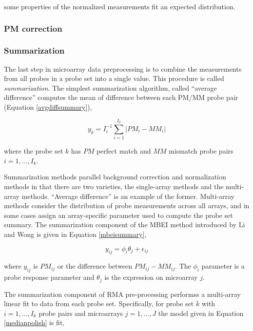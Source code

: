 some properties of the normalized measurements fit an expected distribution.

\subsubsection{PM correction}
\label{PM correction}

\subsubsection{Summarization}
\label{Summarization}

The last step in microarray data preprocessing is to combine the measurements
from all probes in a probe set into a single value.  This procedure is called
\emph{summarization}.  The simplest summarization algorithm, called ``average
difference'' \cite{affy4} computes the mean of difference between each PM/MM
probe pair (Equation \ref{avgdiffsummary}),

\begin{equation}
\label{avgdiffsummary}
y_{k} = I_i^{-1}{\sum_{i=1}^{I_k} |PM_i-MM_i|}
\end{equation}

where the probe set $k$ has $PM$ perfect match and $MM$ mismatch probe pairs $i
= 1,\dots,I_k$.

Summarization methods parallel background correction and normalization methods
in that there are two varieties, the single-array methods and the multi-array
methods.  ``Average difference'' is an example of the former.  Multi-array
methods consider the distribution of probe measurements across all arrays, and
in some cases assign an array-specific parameter used to compute the probe set
summary.  The summarization component of the MBEI method introduced by Li and
Wong \cite{mbei,dchip} is given in Equation \ref{mbeisummary},

\begin{equation}
\label{mbeisummary}
y_{ij} = \phi_i \theta_j + \epsilon_{ij}
\end{equation}

where $y_{ij}$ is $PM_{ij}$ or the difference between $PM_{ij}-MM_{ij}$. The
$\phi_i$ parameter is a probe response parameter and $\theta_j$ is the
expression on microarray $j$.

The summarization component of RMA pre-processing \cite{rma} performss a
multi-array linear fit to data from each probe set.  Specifically, for probe
set $k$ with $i=1,\dots,I_k$ probe pairs and microarrays $j=1,\dots,J$ the
model given in Equation \ref{medianpolish} is fit,

